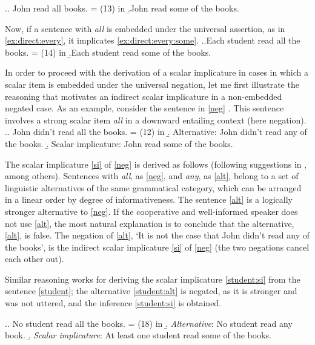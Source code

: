 \ex.\a. \label{ex:direct:all}John read all books. \hfill = (13) in \citealt{Chemla:09}
\b.\label{ex:direct:some}John read some of the books.

Now, if a sentence with \textit{all} is embedded under the universal assertion, as in \ref{ex:direct:every}, it implicates \ref{ex:direct:every:some}.
\ex.\a.\label{ex:direct:every}Each student read all the books. \hfill = (14) in \citealt{Chemla:09}
\b.\label{ex:direct:every:some}Each student read some of the books.

In order to proceed with the derivation of a scalar implicature in cases in which a scalar item is embedded under the universal negation, let me first illustrate the reasoning that motivates an indirect scalar implicature in a non-embedded negated case. As an example, consider the sentence in \ref{neg} \citep[taken from][]{Chemla:09}. This sentence involves a strong scalar item \textit{all} in a downward entailing context (here negation).
\ex.\a. \label{neg} John didn't read all the books. \hfill = (12) in \citealt{Chemla:09}
\b. \label{alt} Alternative: John didn't read any of the books.
\b. \label{si} Scalar implicature: John read some of the books.

The scalar implicature \ref{si} of \ref{neg} is derived as follows (following suggestions in \citealp{Grice:75, Ducrot:69, Horn:72}, among others). Sentences with \textit{all}, as \ref{neg}, and \textit{any}, as \ref{alt}, belong to a set of linguistic alternatives of the same grammatical category, which can be arranged in a linear order by degree of informativeness. The sentence \ref{alt} is a logically stronger alternative to \ref{neg}. If the cooperative and well-informed speaker does not use \ref{alt}, the most natural explanation is to conclude that the alternative, \ref{alt}, is false. The negation of \ref{alt}, `It is not the case that John didn't read any of the books', is the indirect scalar implicature \ref{si} of \ref{neg} (the two negations cancel each other out).

Similar reasoning works for deriving the scalar implicature \ref{student:si} from the sentence \ref{student}; the alternative \ref{student:alt} is negated, as it is stronger and was not uttered, and the inference \ref{student:si} is obtained.

\ex.\a. \label{student}No student read all the books. \hfill = (18) in \citealt{Chemla:09}
\b. \label{student:alt} \textit{Alternative}: No student read any book.
\b. \label{student:si} \textit{Scalar implicature}: At least one student read some of the books.

